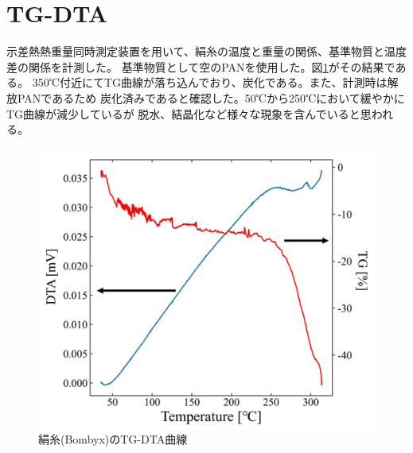 \documentclass[dvipdfmx,12pt,a4paper]{jreport}
\begin{document}
	\section{TG-DTA}
	示差熱熱重量同時測定装置を用いて、絹糸の温度と重量の関係、基準物質と温度差の関係を計測した。
	基準物質として空のPANを使用した。図\ref{TG_DTA}がその結果である。
	350℃付近にてTG曲線が落ち込んでおり、炭化である。また、計測時は解放PANであるため
	炭化済みであると確認した。50℃から250℃において緩やかにTG曲線が減少しているが
	脱水、結晶化など様々な現象を含んでいると思われる。
	\begin{figure}[H]
		\centering
		\includegraphics[scale=0.4]{TG_DTA.jpg}
		\caption{絹糸(Bombyx)のTG-DTA曲線}
		\label{TG_DTA}
	\end{figure}
	\newpage
\end{document}
